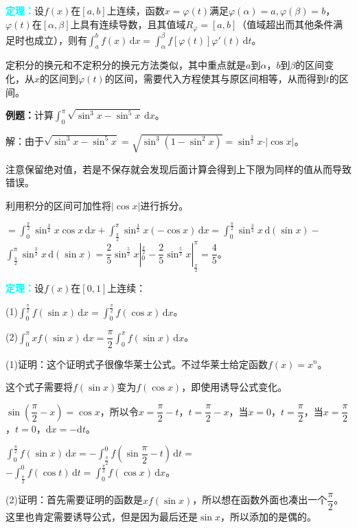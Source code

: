 \documentclass[UTF8, 12pt]{ctexart}
\begin{document}
\textcolor{aqua}{\textbf{定理：}}设$f(x)$在$[a,b]$上连续，函数$x=\varphi(t)$满足$\varphi(\alpha)=a,\varphi(\beta)=b$，$\varphi(t)$在$[\alpha,\beta]$上具有连续导数，且其值域$R_\varphi=[a,b]$（值域超出而其他条件满足时也成立），则有$\int_a^bf(x)\,\textrm{d}x=\int_\alpha^\beta f[\varphi(t)]\varphi'(t)\,\textrm{d}t$。

定积分的换元和不定积分的换元方法类似，其中重点就是$a$到$\alpha$，$b$到$\beta$的区间变化，从$x$的区间到$\varphi(t)$的区间，需要代入方程使其与原区间相等，从而得到$t$的区间。

\textbf{例题：}计算$\int_0^\pi\sqrt{\sin^3x-\sin^5x}\,\textrm{d}x$。

解：由于$\sqrt{\sin^3x-\sin^5x}=\sqrt{\sin^3(1-\sin^2x)}=\sin^\frac{3}{2}x\cdot\vert\cos x\vert$。

注意保留绝对值，若是不保存就会发现后面计算会得到上下限为同样的值从而导致错误。

利用积分的区间可加性将$\vert\cos x\vert$进行拆分。

$=\int_0^\frac{\pi}{2}\sin^\frac{3}{2}x\cos x\,\textrm{d}x+\int_\frac{\pi}{2}^\pi\sin^\frac{3}{2}x(-\cos x)\,\textrm{d}x=\int_0^\frac{\pi}{2}\sin^\frac{3}{2}x\,\textrm{d}(\sin x)-$\\$\int_\frac{\pi}{2}^\pi\sin^\frac{3}{2}x\,\textrm{d}(\sin x)=\dfrac{2}{5}\sin^\frac{5}{2}x|_0^\frac{\pi}{2}-\dfrac{2}{5}\sin^\frac{5}{2}x|_\frac{\pi}{2}^\pi=\dfrac{4}{5}$。

\textcolor{aqua}{\textbf{定理：}}设$f(x)$在$[0,1]$上连续：

(1)$\int_0^\frac{\pi}{2}f(\sin x)\,\textrm{d}x=\int_0^\frac{\pi}{2}f(\cos x)\,\textrm{d}x$。

(2)$\int_0^\pi xf(\sin x)\,\textrm{d}x=\dfrac{\pi}{2}\int_0^\pi f(\sin x)\,\textrm{d}x$。

(1)证明：这个证明式子很像华莱士公式。不过华莱士给定函数$f(x)=x^n$。

这个式子需要将$f(\sin x)$变为$f(\cos x)$，即使用诱导公式变化。

$\sin\left(\dfrac{\pi}{2}-x\right)=\cos x$，所以令$x=\dfrac{\pi}{2}-t$，$t=\dfrac{\pi}{2}-x$，当$x=0$，$t=\dfrac{\pi}{2}$，当$x=\dfrac{\pi}{2}$，$t=0$，$\textrm{d}x=-\textrm{d}t$。

$\int_0^\frac{\pi}{2}f(\sin x)\,\textrm{d}x=-\displaystyle{\int_\frac{\pi}{2}^0f\left(\sin\dfrac{\pi}{2}-t\right)\,\textrm{d}t}=$$-\int_\frac{\pi}{2}^0f(\cos t)\,\textrm{d}t=\int^\frac{\pi}{2}_0f(\cos x)\,\textrm{d}x$。

(2)证明：首先需要证明的函数是$xf(\sin x)$，所以想在函数外面也凑出一个$\dfrac{\pi}{2}$。这里也肯定需要诱导公式，但是因为最后还是$\sin x$，所以添加的是偶的。
\end{document}
